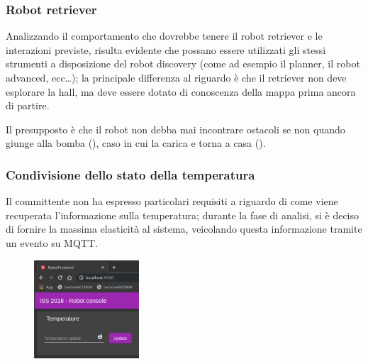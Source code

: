 \subsubsection{Robot retriever}

Analizzando il comportamento che dovrebbe tenere il robot retriever e le interazioni previste, risulta evidente che possano essere utilizzati gli stessi strumenti a disposizione del robot discovery (come ad esempio il planner, il robot advanced, ecc\ldots);
la principale differenza al riguardo è che il retriever non deve esplorare la hall, ma deve essere dotato di conoscenza della mappa prima ancora di partire.

Il presupposto è che il robot non debba mai incontrare ostacoli se non quando giunge alla bomba (), caso in cui la carica e torna a casa ().


\subsubsection{Condivisione dello stato della temperatura}

Il committente non ha espresso particolari requisiti a riguardo di come viene recuperata l'informazione sulla temperatura;
durante la fase di analisi, si è deciso di fornire la massima elasticità al sistema, veicolando questa informazione tramite un evento su MQTT\@.

\begin{figure}[H]
  \centering
  \includegraphics[width=0.35\textwidth]{res/sprint4/temp-ctrl.png}%
  \label{fig:sp4:temp-ctrl}
\end{figure}

